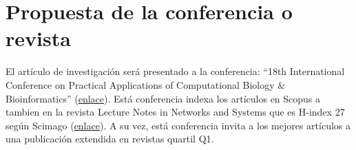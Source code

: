 \documentclass[a4paper]{article}
\begin{document}
\section{Propuesta de la conferencia o revista}

El artículo de investigación será presentado a la conferencia: ``18th International Conference on Practical Applications of Computational Biology \& Bioinformatics'' (\href{https://www.pacbb.net/}{enlace}). Está conferencia indexa los artículos en Scopus a tambien en la revista Lecture Notes in Networks and Systems que es H-index 27 según Scimago (\href{https://www.scimagojr.com/journalsearch.php?q=21100901469&tip=sid&clean=0}{enlace}). A su vez, está conferencia invita a los mejores artículos a una publicación extendida en revistas quartil Q1.


\clearpage
	
	
	
	
\end{document}
